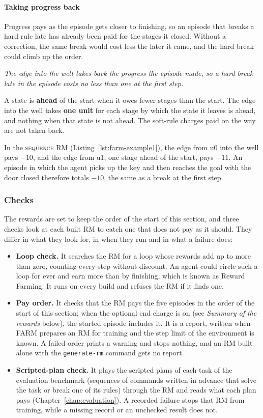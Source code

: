 \documentclass[11pt,english,listoffigures,listoftables]{tfgetsinf}
\newcommand{\runex}[1]{\textsc{#1}}  %
\newcommand{\keyidea}[1]{\par\smallskip\noindent\hspace*{0.6em}{\color{gray!55}\vrule width 1.5pt}\hspace{8pt}\parbox[t]{\dimexpr\linewidth-0.6em-9.5pt\relax}{\itshape #1}\par\smallskip}  %
\newcommand{\loss}[1]{\textcolor{red!60!black}{\bfseries\boldmath #1}}  %
\begin{document}
\paragraph{Taking progress back}
Progress pays as the episode gets closer to finishing, so an episode that breaks a hard rule late has already been paid for the stages it closed. Without a correction, the same break would cost less the later it came, and the hard break could climb up the order.

\keyidea{The edge into the well takes back the progress the episode made, so a hard break late in the episode costs no less than one at the first step.}
\noindent A state is \textbf{ahead} of the start when it owes fewer stages than the start. The edge into the well takes \loss{one unit} for each stage by which the state it leaves is ahead, and nothing when that state is not ahead. The soft-rule charges paid on the way are not taken back.

In the \runex{sequence} RM (Listing~\ref{lst:farm-example1}), the edge from u0 into the well pays \loss{$-10$}, and the edge from u1, one stage ahead of the start, pays \loss{$-11$}. An episode in which the agent picks up the key and then reaches the goal with the door closed therefore totals \loss{$-10$}, the same as a break at the first step.

\subsubsection{Checks}
The rewards are set to keep the order of the start of this section, and three checks look at each built RM to catch one that does not pay as it should. They differ in what they look for, in when they run and in what a failure does:

\begin{itemize}
    \item \textbf{Loop check.} It searches the RM for a loop whose rewards add up to more than zero, counting every step without discount. An agent could circle such a loop for ever and earn more than by finishing, which is known as Reward Farming. It runs on every build and refuses the RM if it finds one.
    \item \textbf{Pay order.} It checks that the RM pays the five episodes in the order of the start of this section; when the optional end charge is on (see \emph{Summary of the rewards} below), the started episode includes it. It is a report, written when FARM prepares an RM for training and the step limit of the environment is known. A failed order prints a warning and stops nothing, and an RM built alone with the \texttt{generate-rm} command gets no report.
    \item \textbf{Scripted-plan check.} It plays the scripted plans of each task of the evaluation benchmark (sequences of commands written in advance that solve the task or break one of its rules) through the RM and reads what each plan pays (Chapter~\ref{chap:evaluation}). A recorded failure stops that RM from training, while a missing record or an unchecked result does not.
\end{itemize}
\end{document}
